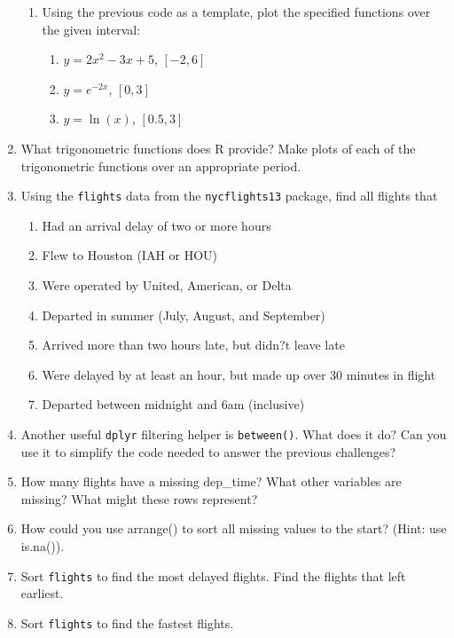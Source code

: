\documentclass[12pt]{article}\usepackage[]{graphicx}\usepackage[]{color}
\begin{document}
\begin{enumerate}
    \begin{enumerate}
      \item Using the previous code as a template, plot the specified functions over the given interval:
      \begin{enumerate}
        \item $y=2x^2 - 3x + 5$, $[-2,6]$
        \item $y=e^{-2x}$, $[0,3]$
        \item $y=\ln(x)$, $[0.5,3]$
      \end{enumerate}
    \end{enumerate}
    \item What trigonometric functions does R provide? Make plots of each of the trigonometric functions over an appropriate period. 
    \item Using the {\tt flights} data from the {\tt nycflights13} package,  find all flights that
    \begin{enumerate}
      \item Had an arrival delay of two or more hours
      \item Flew to Houston (IAH or HOU)
      \item Were operated by United, American, or Delta
      \item Departed in summer (July, August, and September)
      \item Arrived more than two hours late, but didn?t leave late
      \item Were delayed by at least an hour, but made up over 30 minutes in flight
      \item Departed between midnight and 6am (inclusive)
    \end{enumerate}
    \item Another useful {\tt dplyr} filtering helper is {\tt between()}. What does it do? Can you use it to simplify the code needed to answer the previous challenges?
    \item How many flights have a missing dep\_time? What other variables are missing? What might these rows represent?
    \item How could you use arrange() to sort all missing values to the start? (Hint: use is.na()).
    \item Sort {\tt flights} to find the most delayed flights. Find the flights that left earliest.
    \item Sort {\tt flights} to find the fastest flights.
    \end{enumerate}
    
\end{document}
